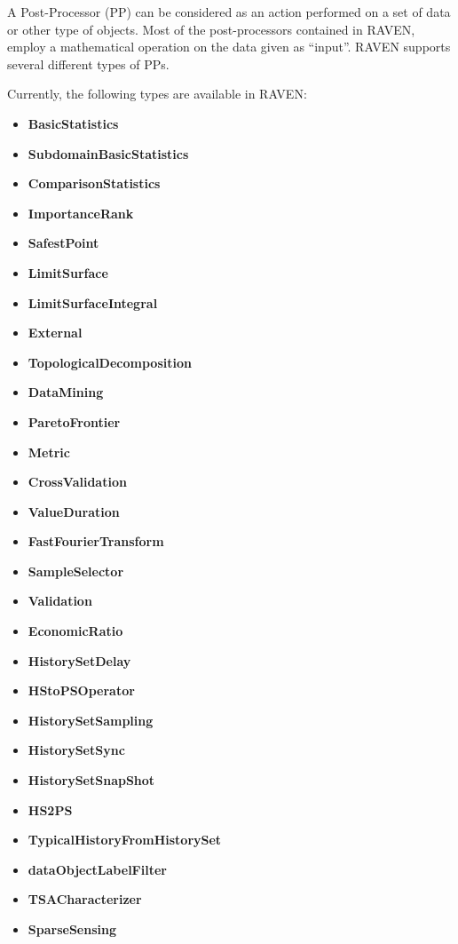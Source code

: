 A Post-Processor (PP) can be considered as an action performed on a set of data
or other type of objects.
%
Most of the post-processors contained in RAVEN, employ a mathematical operation
on the data given as ``input''.
%
RAVEN supports several different types of PPs.

Currently, the following types are available in RAVEN:
\begin{itemize}
  \itemsep0em
  \item \textbf{BasicStatistics}
  \item \textbf{SubdomainBasicStatistics}
  \item \textbf{ComparisonStatistics}
  \item \textbf{ImportanceRank}
  \item \textbf{SafestPoint}
  \item \textbf{LimitSurface}
  \item \textbf{LimitSurfaceIntegral}
  \item \textbf{External}
  \item \textbf{TopologicalDecomposition}
  \item \textbf{DataMining}
  \item \textbf{ParetoFrontier}
  \item \textbf{Metric}
  \item \textbf{CrossValidation}
  \item \textbf{ValueDuration}
  \item \textbf{FastFourierTransform}
  \item \textbf{SampleSelector}
  \item \textbf{Validation}
  \item \textbf{EconomicRatio}
  \item \textbf{HistorySetDelay}
  \item \textbf{HStoPSOperator}
  \item \textbf{HistorySetSampling}
  \item \textbf{HistorySetSync}
  \item \textbf{HistorySetSnapShot}
  \item \textbf{HS2PS}
  \item \textbf{TypicalHistoryFromHistorySet}
  \item \textbf{dataObjectLabelFilter}
  \item \textbf{TSACharacterizer}
  \item \textbf{SparseSensing}
\end{itemize}

